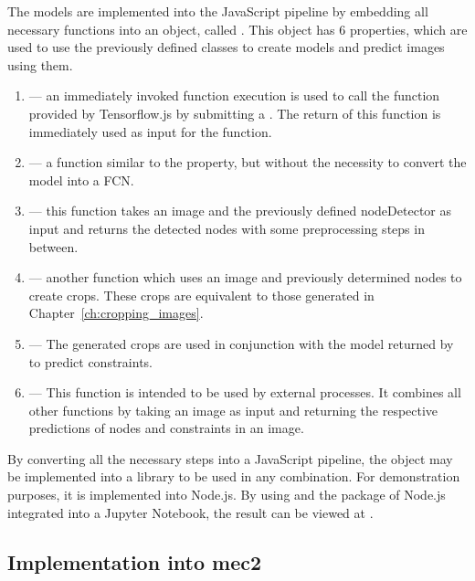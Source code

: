 The models are implemented into the JavaScript pipeline by embedding all necessary functions into an object, called .
This object has 6 properties, which are used to use the previously defined classes to create models and predict images using them.

\begin{enumerate}
    \item {} --- an immediately invoked function execution is used to call the  function provided by Tensorflow.js by submitting a .
    The return of this function is immediately used as input for the  function.
    \item {} --- a function similar to the  property, but without the necessity to convert the model into a FCN.\@
    \item {} --- this function takes an image and the previously defined nodeDetector as input and returns the detected nodes with some preprocessing steps in between.
    \item {} --- another function which uses an image and previously determined nodes to create crops. These crops are equivalent to those generated in Chapter~\ref{ch:cropping_images}.
    \item {} --- The generated crops are used in conjunction with the model returned by  to predict constraints.
    \item {} --- This function is intended to be used by external processes.
    It combines all other functions by taking an image as input and returning the respective predictions of nodes and constraints in an image.
\end{enumerate}

By converting all the necessary steps into a JavaScript pipeline, the  object may be implemented into a library to be used in any combination.
For demonstration purposes, it is implemented into Node.js. %
By using  and the  package of Node.js integrated into a Jupyter Notebook, the result can be viewed at .

\subsection{Implementation into mec2}


